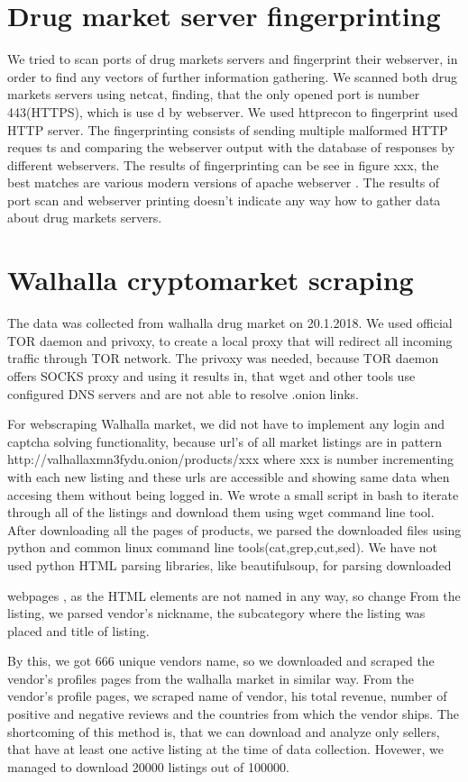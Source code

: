 \documentclass[
  digital, %
  table,   %
  lof,     %
  lot,     %
  oneside
]{fithesis3}
\begin{document}
\section{Drug market server fingerprinting}
We tried to scan ports of drug markets servers and fingerprint their webserver, in order to find any vectors of further 
information gathering.
We scanned both drug markets servers using netcat, finding, that the only opened port is number 443(HTTPS), which is use
d by webserver.
We used httprecon to fingerprint used HTTP server. The fingerprinting consists of sending multiple malformed HTTP reques
ts and comparing the webserver output with the database of responses by different webservers.
The results of fingerprinting can be see in figure xxx, the best matches are various modern versions of apache webserver
.
The results of port scan and webserver printing doesn't indicate any way how to gather data about drug markets servers.

\section{Walhalla cryptomarket scraping}
The data was collected from walhalla drug market on 20.1.2018.
We used official TOR daemon and privoxy, to create a local proxy that will redirect all
incoming traffic through TOR network. The privoxy was needed, because TOR 
daemon offers SOCKS proxy and using it results in, that wget and other tools use 
configured DNS servers and are not able to resolve .onion links.

For webscraping Walhalla market, we did not have to implement any login and captcha solving functionality,
because url's of all market listings are in pattern http://valhallaxmn3fydu.onion/products/xxx where 
xxx is number incrementing with each new listing and these urls are accessible and showing same data when 
accesing them without being logged in.
We wrote a small script in bash to iterate through all of the listings and download them using wget command line tool.
After downloading all the pages of products, we parsed the downloaded files using python and common linux command 
line tools(cat,grep,cut,sed). We have not used python HTML parsing libraries, like beautifulsoup, for parsing downloaded

webpages , as the HTML elements
are not named in any way, so change 
From the listing, we parsed vendor's nickname, the subcategory where the listing was placed and title of listing.

By this, we got 666 unique vendors name, so we downloaded and scraped the vendor's profiles pages from the walhalla 
market in similar way.
From the vendor's profile pages, we scraped name of vendor, his total revenue, number of positive and negative reviews 
and the countries from which the vendor ships.
The shortcoming of this method is, that we can download and analyze only sellers, 
that have at least one active listing at the time of data collection. 
Hovewer, we managed to download 20000 listings out of 100000.
\end{document}
